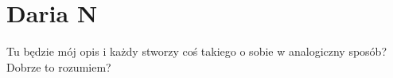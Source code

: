 \section{Daria N}
Tu będzie mój opis i każdy stworzy coś takiego o sobie w analogiczny sposób? Dobrze to rozumiem?
